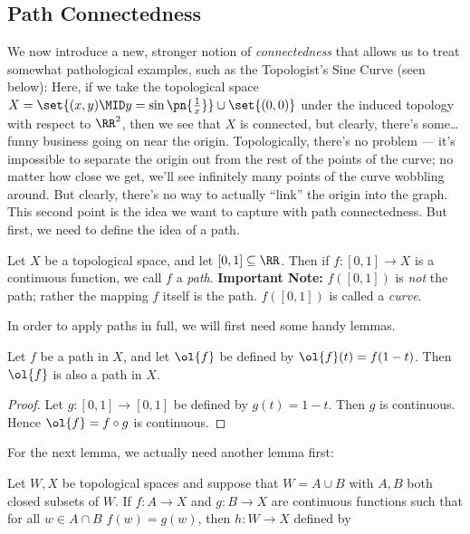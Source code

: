 \documentclass{fkbook}
\begin{document}
\begin{adjustwidth}{1em}{1em}
  \subsection{Path Connectedness}
  We now introduce a new, stronger notion of \emph{connectedness} that
  allows us to treat somewhat pathological examples, such as the
  Topologist's Sine Curve (seen below):
  Here, if we take the topological space $X = \set{(x,y) \MID y =
    \sin\pn{\frac{1}{x}}} \cup \set{(0,0)}$ under the induced topology
  with respect to $\RR^2$, then we see that $X$ is connected, but
  clearly, there's some\ldots funny business going on near the origin.
  Topologically, there's no problem --- it's impossible to separate
  the origin out from the rest of the points of the curve; no matter
  how close we get, we'll see infinitely many points of the curve
  wobbling around. But clearly, there's no way to actually ``link''
  the origin into the graph. This second point is the idea we want to
  capture with path connectedness. But first, we need to define the
  idea of a path.
  \begin{definition}[Path]
    Let $X$ be a topological space, and let $[0,1] \subseteq \RR$.
    Then if $f : [0,1] \to X$ is a continuous function, we call $f$ a
    \emph{path}. \textbf{Important Note:} $f([0,1])$ is \emph{not} the
    path; rather the mapping $f$ itself is the path. $f([0,1])$ is
    called a \emph{curve}.
  \end{definition}
  In order to apply paths in full, we will first need some handy
  lemmas.
  \begin{lemma}
    Let $f$ be a path in $X$, and let $\ol{f}$ be defined by
    $\ol{f}(t) = f(1-t)$. Then $\ol{f}$ is also a path in $X$.
  \end{lemma}
  \begin{proof}
    Let $g : [0,1] \to [0,1]$ be defined by $g(t) = 1 -t$. Then $g$ is
    continuous. Hence $\ol{f} = f \circ g$ is continuous.
  \end{proof}
  For the next lemma, we actually need another lemma first:
  \begin{lemma}
    Let $W,X$ be topological spaces and suppose that $W = A \cup B$
    with $A,B$ both closed subsets of $W$. If $f : A \to X$ and $g : B
    \to X$ are continuous functions such that for all $w \in A \cap B$
    $f(w) = g(w)$, then $h : W \to X$ defined by

\end{lemma}
\end{adjustwidth}
\end{document}

